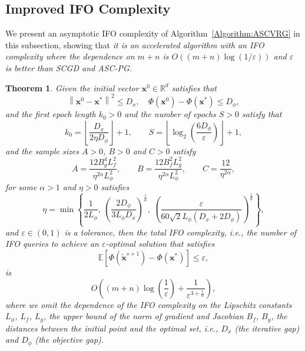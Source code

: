 \documentclass[11pt]{article}
\newtheorem{theorem}{Theorem}[section]
\newcommand{\BE}{\mathbb{E}}
\newcommand{\x}{\mathbf x}
\newcommand{\br}{\mathbb{R}}
\begin{document}
\subsection{Improved IFO Complexity}
We present an asymptotic IFO complexity of Algorithm~\ref{Algorithm:ASCVRG} in this subsection, showing that \textit{it is an accelerated algorithm with an IFO complexity where the dependence on $m+n$ is $O((m+n)\log(1/\varepsilon))$ and $\varepsilon$ is better than SCGD and ASC-PG.}
\begin{theorem}
Given the initial vector $\x^0\in\br^d$ satisfies that 
\begin{equation*}
\left\|\x^0 - \x^*\right\|^2 \leq D_x, \quad \Phi(\x^0)-\Phi(\x^*) \leq D_\phi,  
\end{equation*}
and the first epoch length $k_0 >0$ and the number of epochs $S>0$ satisfy that 
\begin{equation*}
k_0 = \left\lfloor \frac{D_x}{2 \eta D_\phi} \right\rfloor + 1, \qquad S = \left\lfloor\log_2\left(\frac{6D_\phi}{\varepsilon}\right) \right\rfloor + 1, 
\end{equation*}
and the sample sizes $A>0$, $B>0$ and $C>0$ satisfy 
\begin{equation*}
A = \frac{12 B_g^4 L_f^2}{\eta^{2\alpha}L_\phi^2}, \qquad B = \frac{12 B_f^2 L_g^2}{\eta^{2\alpha}L_\phi^2},  \qquad C = \frac{12}{\eta^{2\alpha}},
\end{equation*}
for some $\alpha>1$ and $\eta>0$ satisfies 
\begin{equation*}
\eta = \min\left\{\frac{1}{2L_\phi}, \ \left(\frac{2D_\phi}{3L_\phi D_x}\right)^{\frac{1}{\alpha}}, \ \left(\frac{\varepsilon}{60\sqrt{2} L_\phi\left(D_x + 2D_\phi\right)}\right)^{\frac{1}{\alpha}}\right\},
\end{equation*}
and $\varepsilon\in\left(0,1\right)$ is a tolerance, then the total IFO complexity, i.e., the number of IFO queries to achieve an $\varepsilon$-optimal solution that satisfies
\begin{equation*}
\BE\left[\Phi(\tilde{\x}^{s+1}) - \Phi(\x^*)\right] \leq \varepsilon, 
\end{equation*}
is
\begin{equation*}
O\left(\left(m+n\right)\log\left(\frac{1}{\varepsilon}\right) + \frac{1}{\varepsilon^{3+\frac{1}{\alpha}}}\right),
\end{equation*}
where we omit the dependence of the IFO complexity on the Lipschitz constants $L_\phi$, $L_f$, $L_g$, the upper bound of the norm of gradient and Jacobian $B_f$, $B_g$, the distances between the initial point and the optimal set, i.e., $D_x$ (the iterative gap) and $D_\phi$ (the objective gap).
\end{theorem}
\end{document}
